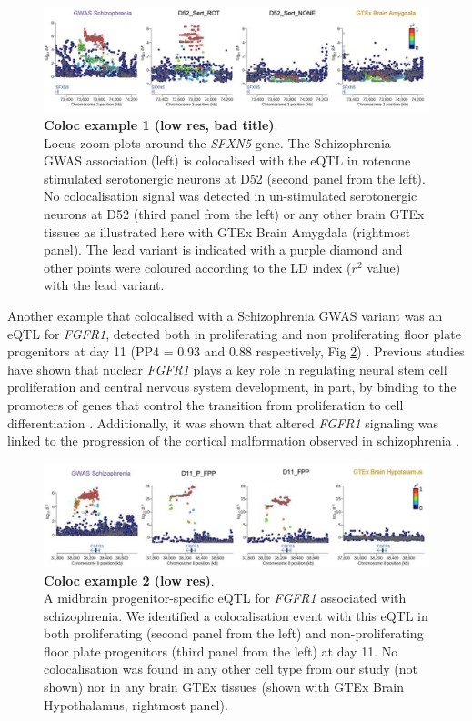 \begin{figure}[h]
\centering
\includegraphics[width=16cm]{Chapter5/Fig/neuroseq_coloc_example1_SFXN5.png}
\caption[Coloc example 1]{\textbf{Coloc example 1 (low res, bad title)}.\\
Locus zoom plots around the \textit{SFXN5} gene. 
The Schizophrenia GWAS association (left) is colocalised with the eQTL in rotenone stimulated serotonergic neurons at D52 (second panel from the left). 
No colocalisation signal was detected in un-stimulated serotonergic neurons at D52 (third panel from the left) or any other brain GTEx tissues as illustrated here with GTEx Brain Amygdala (rightmost panel). 
The lead variant is indicated with a purple diamond and other points were coloured according to the LD index ($r^2$ value) with the lead variant.}
\label{fig:neuroseq_coloc_example1}
\end{figure}

Another example that colocalised with a Schizophrenia GWAS variant was an eQTL for
\textit{FGFR1}, detected both in proliferating and non proliferating floor plate progenitors at day 11 (PP4 = 0.93 and 0.88 respectively, Fig \ref{fig:neuroseq_coloc_example2}) . 
Previous studies have shown that nuclear \textit{FGFR1} plays a key role in regulating neural stem cell proliferation and central nervous system development, in part, by binding to the promoters of genes that control the transition from proliferation to cell differentiation \cite{ma2009molecular}. 
Additionally, it was shown that altered \textit{FGFR1} signaling was linked to the progression of the cortical malformation observed in schizophrenia \cite{stachowiak2017cerebral}.\\

\begin{figure}[h]
\centering
\includegraphics[width=16cm]{Chapter5/Fig/neuroseq_coloc_example2_FGFR1.png}
\caption[Coloc example 2]{\textbf{Coloc example 2 (low res)}.\\
A midbrain progenitor-specific eQTL for \textit{FGFR1} associated with schizophrenia. 
We identified a colocalisation event with this eQTL in both proliferating (second panel from the left) and non-proliferating floor plate progenitors (third panel from the left) at day 11. 
No colocalisation was found in any other cell type from our study (not shown) nor in any brain GTEx tissues (shown with GTEx Brain Hypothalamus, rightmost panel).}
\label{fig:neuroseq_coloc_example2}
\end{figure}

